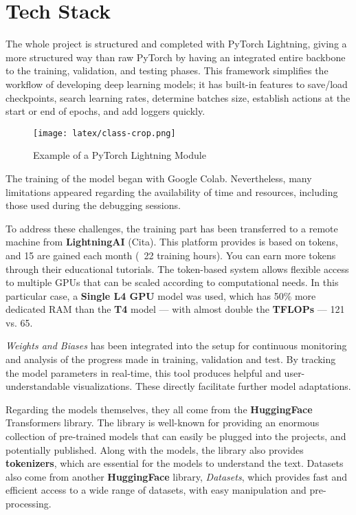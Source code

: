\documentclass[11pt]{article}
\begin{document}
\section{Tech Stack}

The whole project is structured and completed with PyTorch Lightning, giving a more structured way than raw PyTorch by having an integrated entire backbone to the training, validation, and testing phases. This framework simplifies the workflow of developing deep learning models; it has built-in features to save/load checkpoints, search learning rates, determine batches size, establish actions at the start or end of epochs, and add loggers quickly.

\begin{figure}[!ht]
    \centering
    \texttt{[image: latex/class-crop.png]}
    \caption{Example of a PyTorch Lightning Module}
\end{figure}

The training of the model began with Google Colab. Nevertheless, many limitations appeared regarding the availability of time and resources, including those used during the debugging sessions. 

To address these challenges, the training part has been transferred to a remote machine from \textbf{LightningAI} (Cita). This platform provides is based on tokens, and 15 are gained each month (~22 training hours). You can earn more tokens through their educational tutorials. The token-based system allows flexible access to multiple GPUs that can be scaled according to computational needs. In this particular case, a \textbf{Single L4 GPU} model was used, which has 50\% more dedicated RAM than the \textbf{T4} model — with almost double the \textbf{TFLOPs} — 121 vs. 65.

\textit{Weights and Biases} has been integrated into the setup for continuous monitoring and analysis of the progress made in training, validation and test. By tracking the model parameters in real-time, this tool produces helpful and user-understandable visualizations. These directly facilitate further model adaptations. 

Regarding the models themselves, they all come from the \textbf{HuggingFace} Transformers library. The library is well-known for providing an enormous collection of pre-trained models that can easily be plugged into the projects, and potentially published. Along with the models, the library also provides \textbf{tokenizers}, which are essential for the models to understand the text. Datasets also come from another \textbf{HuggingFace} library, \textit{Datasets}, which provides fast and efficient access to a wide range of datasets, with easy manipulation and pre-processing.
\end{document}

